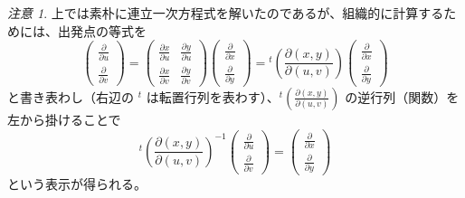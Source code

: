\documentclass[a4paper]{jsarticle}
\theoremstyle{definition}
\theoremstyle{remark}
\newtheorem{Remark}{注意}
\newcommand{\del}{\partial}
\begin{document}
\begin{Remark}{\small
  上では素朴に連立一次方程式を解いたのであるが、組織的に計算するためには、出発点の等式を
  \[
    \begin{pmatrix}
      \frac{\partial}{\partial u}\\
      \frac{\partial}{\partial v}
    \end{pmatrix}
    =
    \begin{pmatrix}
      \frac{\del x}{\del u} & \frac{\del y}{\del u}\\
      \frac{\del x}{\del v} & \frac{\del y}{\del v}
    \end{pmatrix}
    \begin{pmatrix}
      \frac{\partial}{\partial x}\\
      \frac{\partial}{\partial y}
    \end{pmatrix}
    = {}^t\left(\frac{\partial(x,y)}{\partial(u,v)}\right)
    \begin{pmatrix}
      \frac{\partial}{\partial x}\\
      \frac{\partial}{\partial y}
    \end{pmatrix}
  \]
  と書き表わし（右辺の ${}^t$ は転置行列を表わす）、${}^t (\frac{\partial(x,y)}{\partial(u,v)})$ の逆行列（関数）を左から掛けることで
  \[
    {}^t\left(\frac{\partial(x,y)}{\partial(u,v)}\right)^{-1}
    \begin{pmatrix}
      \frac{\partial}{\partial u}\\
      \frac{\partial}{\partial v}
    \end{pmatrix}
    =
     \begin{pmatrix}
      \frac{\partial}{\partial x}\\
      \frac{\partial}{\partial y}
    \end{pmatrix}
  \]
  という表示が得られる。}
\end{Remark}
\end{document}
